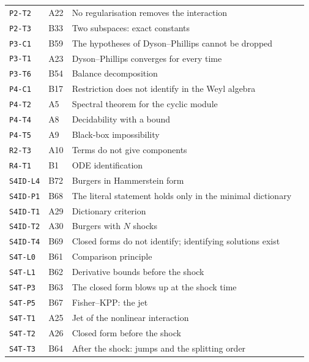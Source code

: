 \begin{center}
\begin{longtable}{@{}L{3.0cm}L{1.2cm}L{8.4cm}L{1.2cm}@{}}
\texttt{P2-T2} & A22 & No regularisation removes the interaction & \pageref{dim:P2-T2}\\
\texttt{P2-T3} & B33 & Two subspaces: exact constants & \pageref{dim:P2-T3}\\
\texttt{P3-C1} & B59 & The hypotheses of Dyson--Phillips cannot be dropped & \pageref{dim:P3-C1}\\
\texttt{P3-T1} & A23 & Dyson--Phillips converges for every time & \pageref{dim:P3-T1}\\
\texttt{P3-T6} & B54 & Balance decomposition & \pageref{dim:P3-T6}\\
\texttt{P4-C1} & B17 & Restriction does not identify in the Weyl algebra & \pageref{dim:P4-C1}\\
\texttt{P4-T2} & A5 & Spectral theorem for the cyclic module & \pageref{dim:P4-T2}\\
\texttt{P4-T4} & A8 & Decidability with a bound & \pageref{dim:P4-T4}\\
\texttt{P4-T5} & A9 & Black-box impossibility & \pageref{dim:P4-T5}\\
\texttt{R2-T3} & A10 & Terms do not give components & \pageref{dim:R2-T3}\\
\texttt{R4-T1} & B1 & ODE identification & \pageref{dim:R4-T1}\\
\texttt{S4ID-L4} & B72 & Burgers in Hammerstein form & \pageref{dim:S4ID-L4}\\
\texttt{S4ID-P1} & B68 & The literal statement holds only in the minimal dictionary & \pageref{dim:S4ID-P1}\\
\texttt{S4ID-T1} & A29 & Dictionary criterion & \pageref{dim:S4ID-T1}\\
\texttt{S4ID-T2} & A30 & Burgers with $N$ shocks & \pageref{dim:S4ID-T2}\\
\texttt{S4ID-T4} & B69 & Closed forms do not identify; identifying solutions exist & \pageref{dim:S4ID-T4}\\
\texttt{S4T-L0} & B61 & Comparison principle & \pageref{dim:S4T-L0}\\
\texttt{S4T-L1} & B62 & Derivative bounds before the shock & \pageref{dim:S4T-L1}\\
\texttt{S4T-P3} & B63 & The closed form blows up at the shock time & \pageref{dim:S4T-P3}\\
\texttt{S4T-P5} & B67 & Fisher--KPP: the jet & \pageref{dim:S4T-P5}\\
\texttt{S4T-T1} & A25 & Jet of the nonlinear interaction & \pageref{dim:S4T-T1}\\
\texttt{S4T-T2} & A26 & Closed form before the shock & \pageref{dim:S4T-T2}\\
\texttt{S4T-T3} & B64 & After the shock: jumps and the splitting order & \pageref{dim:S4T-T3}\\
\bottomrule
\end{longtable}
\end{center}


